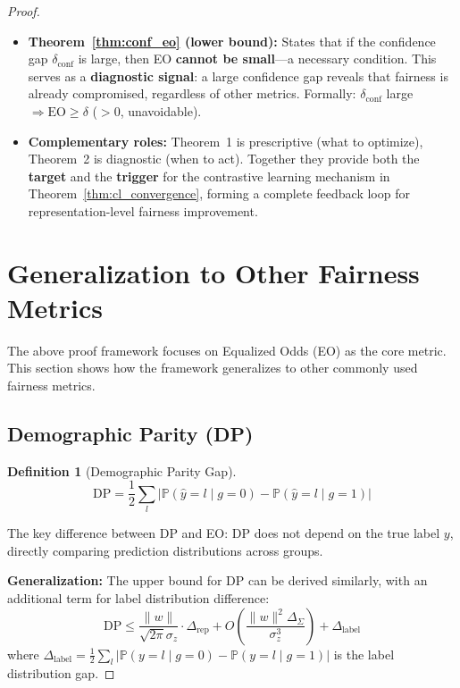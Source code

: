 \documentclass[11pt]{article}
\newtheorem{definition}{Definition}
\begin{document}
\begin{proof}
\begin{itemize}
    \item \textbf{Theorem~\ref{thm:conf_eo} (lower bound):} States that if the confidence gap $\delta_{\mathrm{conf}}$ is large, then EO \textbf{cannot be small}---a necessary condition. This serves as a \textbf{diagnostic signal}: a large confidence gap reveals that fairness is already compromised, regardless of other metrics. Formally: $\delta_{\mathrm{conf}}$ large $\Rightarrow \mathrm{EO} \geq \delta$ ($>0$, unavoidable).

    \item \textbf{Complementary roles:} Theorem~1 is prescriptive (what to optimize), Theorem~2 is diagnostic (when to act). Together they provide both the \textbf{target} and the \textbf{trigger} for the contrastive learning mechanism in Theorem~\ref{thm:cl_convergence}, forming a complete feedback loop for representation-level fairness improvement.
\end{itemize}

\section{Generalization to Other Fairness Metrics}

The above proof framework focuses on Equalized Odds (EO) as the core metric. This section shows how the framework generalizes to other commonly used fairness metrics.

\subsection{Demographic Parity (DP)}

\begin{definition}[Demographic Parity Gap]
$$\mathrm{DP} = \frac{1}{2} \sum_{l} \left|\mathbb{P}(\hat{y}=l \mid g=0) - \mathbb{P}(\hat{y}=l \mid g=1)\right|$$
\end{definition}

The key difference between DP and EO: DP does not depend on the true label $y$, directly comparing prediction distributions across groups.

\textbf{Generalization:} The upper bound for DP can be derived similarly, with an additional term for label distribution difference:
$$\mathrm{DP} \leq \frac{\|w\|}{\sqrt{2\pi}\sigma_z} \cdot \Delta_{\mathrm{rep}} + O\left(\frac{\|w\|^2 \Delta_{\Sigma}}{\sigma_z^3}\right) + \Delta_{\mathrm{label}}$$
where $\Delta_{\mathrm{label}} = \frac{1}{2}\sum_l \left|\mathbb{P}(y=l \mid g=0) - \mathbb{P}(y=l \mid g=1)\right|$ is the label distribution gap.


\end{proof}
\end{document}

